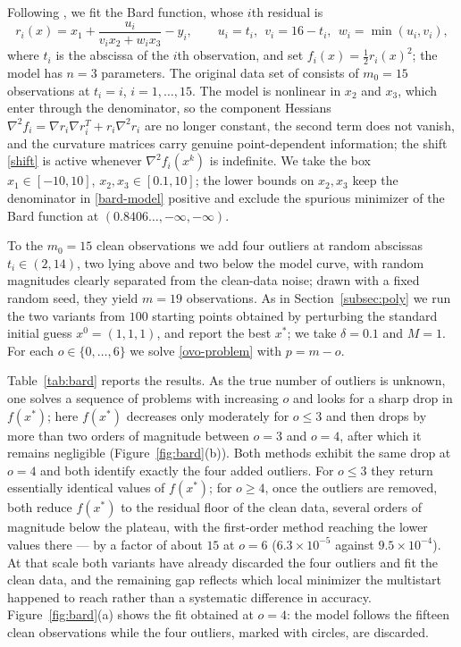 \documentclass[11pt]{article}
\begin{document}
Following \cite{mgh}, we fit the Bard function, whose $i$th residual is
\begin{equation} \label{bard-model}
r_i(x) = x_1 + \frac{u_i}{v_i x_2 + w_i x_3} - y_i, \qquad
u_i = t_i,\ \ v_i = 16 - t_i,\ \ w_i = \min(u_i, v_i),
\end{equation}
where $t_i$ is the abscissa of the $i$th observation, and set
$f_i(x) = \tfrac12 r_i(x)^2$; the model has $n = 3$ parameters. The original
data set of \cite{mgh} consists of $m_0 = 15$ observations at $t_i = i$,
$i = 1, \dots, 15$. The model is nonlinear in $x_2$ and $x_3$, which
enter through the denominator, so the component Hessians
$\nabla^2 f_i = \nabla r_i \nabla r_i^T + r_i \nabla^2 r_i$ are no longer
constant, the second term does not vanish, and the curvature matrices carry
genuine point-dependent information; the shift \eqref{shift} is active
whenever $\nabla^2 f_i(x^k)$ is indefinite. We
take the box $x_1 \in [-10, 10]$, $x_2, x_3 \in [0.1, 10]$; the lower bounds on
$x_2, x_3$ keep the denominator in \eqref{bard-model} positive and exclude the
spurious minimizer of the Bard function at $(0.8406\ldots, -\infty, -\infty)$.

To the $m_0 = 15$ clean observations we add four outliers at random abscissas
$t_i \in (2, 14)$, two lying above and two below the model curve, with random
magnitudes clearly separated from the clean-data noise; drawn with a fixed
random seed, they yield $m = 19$ observations. As in Section~\ref{subsec:poly}
we run the two variants from $100$ starting points obtained by perturbing the
standard initial guess $x^0 = (1,1,1)$, and report the best $x^*$; we take
$\delta = 0.1$ and $M = 1$. For each $o \in \{0, \dots, 6\}$ we solve
\eqref{ovo-problem} with $p = m - o$.

Table~\ref{tab:bard} reports the results. As the true number of outliers is
unknown, one solves a sequence of problems with increasing $o$ and looks for a
sharp drop in $f(x^*)$; here $f(x^*)$ decreases only moderately for $o \le 3$
and then drops by more than two orders of magnitude between $o = 3$ and $o = 4$,
after which it remains negligible (Figure~\ref{fig:bard}(b)). Both methods exhibit the same drop at $o = 4$
and both identify exactly the four added outliers. For $o \le 3$ they return
essentially identical values of $f(x^*)$; for $o \ge 4$, once the outliers are
removed, both reduce $f(x^*)$ to the residual floor of the clean data, several
orders of magnitude below the plateau, with the first-order method reaching the
lower values there --- by a factor of about $15$ at $o = 6$
($6.3\times10^{-5}$ against $9.5\times10^{-4}$). At that scale both variants
have already discarded the four outliers and fit the clean data, and the
remaining gap reflects which local minimizer the multistart happened to reach
rather than a systematic difference in accuracy. Figure~\ref{fig:bard}(a) shows the fit
obtained at $o = 4$: the model follows the fifteen clean observations while the
four outliers, marked with circles, are discarded.
\end{document}
